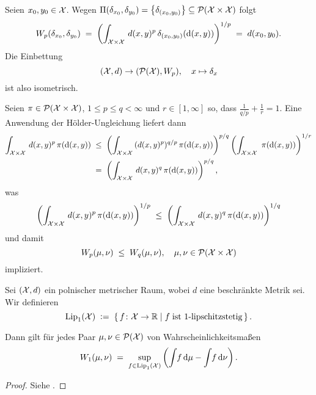 \documentclass[../main/main.tex]{subfiles}
\begin{document}
	\begin{Bemerkung}
		Seien $x_0, y_0 \in \mathcal{X}$. Wegen $\Pi(\delta_{x_0}, \delta_{y_0}) = \left\{\delta_{(x_0, y_0)}\right\} \subseteq \mathcal{P}(\mathcal{X} \times \mathcal{X})$ folgt
		\[ W_p(\delta_{x_0}, \delta_{y_0}) \; = \; \left( \int_{\mathcal{X} \times \mathcal{X}} \, d(x, y)^p \, \delta_{(x_0, y_0)}(\mathrm{d}(x, y)) \right)^{1/p} \; = \; d(x_0, y_0) \text{.} \]
		Die Einbettung 
		\[ (\mathcal{X}, d) \to (\mathcal{P}(\mathcal{X}), W_p), \quad x \mapsto \delta_x \]
		ist also isometrisch.
	\end{Bemerkung}

	\begin{Bemerkung}
		Seien $\pi \in \mathcal{P}(\mathcal{X} \times \mathcal{X})$, $1 \leq p \leq q < \infty$ und $r \in [1, \infty]$ so, dass $\frac{1}{q/p} + \frac{1}{r} = 1$. Eine Anwendung der Hölder-Ungleichung liefert dann
		\begin{align*}
			\int_{\mathcal{X} \times \mathcal{X}} \, d(x, y)^p \, \pi(\mathrm{d}(x, y)) \; &\leq \; \left( \int_{\mathcal{X} \times \mathcal{X}} \, (d(x, y)^p)^{q/p} \, \pi(\mathrm{d}(x, y)) \right)^{p/q} \left( \int_{\mathcal{X} \times \mathcal{X}} \,  \, \pi(\mathrm{d}(x, y)) \right)^{1/r} \\
			                                                    &=    \; \left( \int_{\mathcal{X} \times \mathcal{X}} \, d(x, y)^q \, \pi(\mathrm{d}(x, y)) \right)^{p/q} \text{,}
		\end{align*}
		was
		\[ \left( \int_{\mathcal{X} \times \mathcal{X}} \, d(x, y)^p \, \pi(\mathrm{d}(x, y)) \right)^{1/p} \; \leq \; \left( \int_{\mathcal{X} \times \mathcal{X}} \, d(x, y)^q \, \pi(\mathrm{d}(x, y)) \right)^{1/q} \]
		und damit
		\[ W_p(\mu, \nu) \; \leq \; W_q(\mu, \nu), \quad \mu, \nu \in \mathcal{P}(\mathcal{X} \times \mathcal{X}) \]
		impliziert.
	\end{Bemerkung}

	\begin{Satz}
		\label{thm:kantorovichrubinstein}
		Sei $(\mathcal{X}, d)$ ein polnischer metrischer Raum, wobei $d$ eine beschränkte Metrik sei. Wir definieren
		\[ \mathrm{Lip}_1(\mathcal{X}) \; \vcentcolon = \; \left\{\, f \colon \mathcal{X} \to \mathbb{R} \; \middle| \; f \; \text{ist }1\text{-lipschitzstetig}  \,\right\} \text{.} \]
		
		Dann gilt für jedes Paar $\mu, \nu \in \mathcal{P}(\mathcal{X})$ von Wahrscheinlichkeitsmaßen
		\[ W_1(\mu, \nu) \; = \; \sup_{f \in \mathrm{Lip}_1(\mathcal{X})} \left( \int_{} \, f \, \mathrm{d}\mu - \int_{} \, f \, \mathrm{d}\nu \right) \text{.} \]
	\end{Satz}

	\begin{proof}
		Siehe \cite[Bemerkung 6.5]{Villani.2009}.
	\end{proof}
\end{document}
